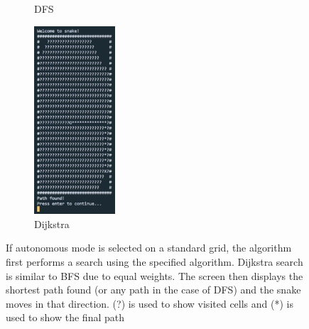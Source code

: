 \documentclass[11pt]{article}
\begin{document}
\begin{figure}[H]
\begin{subfigure}{0.24\textwidth}
    \caption{DFS}
    \label{fig:subim3}
\end{subfigure}
\begin{subfigure}{0.24\textwidth}
    \includegraphics[height=7cm]{Dijkstra_Path_Found}
    \caption{Dijkstra}
    \label{fig:subim4}
\end{subfigure}

\caption{If autonomous mode is selected on a standard grid, the algorithm first performs a search using the specified algorithm. Dijkstra search is similar to BFS due to equal weights. 
The screen then displays the shortest path found (or any path in the case of DFS) and the snake moves in that direction. (?) is used to show visited cells and (*) is used to show the final path}
\label{fig:image2}
\end{figure}
\end{document}

